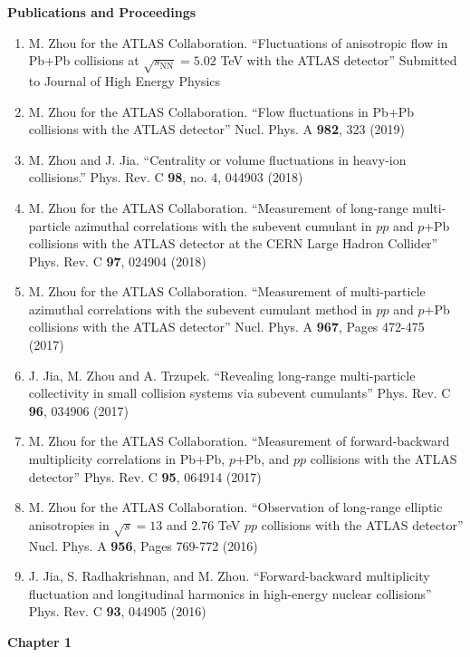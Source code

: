 \documentclass[12pt]{article}
\begin{document}
\newpage
\centerline{\bf{Publications and Proceedings}}
\vspace*{4\baselineskip}
\begin{enumerate}
\item M. Zhou for the ATLAS Collaboration. ``Fluctuations of anisotropic flow in Pb+Pb collisions at $\sqrt{s_\text{NN}}=5.02$ TeV with the ATLAS detector'' Submitted to Journal of High Energy Physics
\item M. Zhou for the ATLAS Collaboration. ``Flow fluctuations in Pb+Pb collisions with the ATLAS detector'' Nucl. Phys. A \textbf{982}, 323 (2019)
\item M. Zhou and J. Jia. ``Centrality or volume fluctuations in heavy-ion collisions.'' Phys. Rev. C \textbf{98}, no. 4, 044903 (2018)
\item M. Zhou for the ATLAS Collaboration. ``Measurement of long-range multi-particle azimuthal correlations with the subevent cumulant in $pp$ and $p$+Pb collisions with the ATLAS detector at the CERN Large Hadron Collider'' Phys. Rev. C \textbf{97}, 024904 (2018)
\item M. Zhou for the ATLAS Collaboration. ``Measurement of multi-particle azimuthal correlations with the subevent cumulant method in $pp$ and $p$+Pb collisions with the ATLAS detector'' Nucl. Phys. A \textbf{967}, Pages 472-475 (2017)
\item J. Jia, M. Zhou and A. Trzupek. ``Revealing long-range multi-particle collectivity in small collision systems via subevent cumulants'' Phys. Rev. C \textbf{96}, 034906 (2017)
\item M. Zhou for the ATLAS Collaboration. ``Measurement of forward-backward multiplicity correlations in Pb+Pb, $p$+Pb, and $pp$ collisions with the ATLAS detector'' Phys. Rev. C \textbf{95}, 064914 (2017)
\item M. Zhou for the ATLAS Collaboration. ``Observation of long-range elliptic anisotropies in $\sqrt{s}=13$ and 2.76 TeV $pp$ collisions with the ATLAS detector'' Nucl. Phys. A \textbf{956}, Pages 769-772 (2016)
\item J. Jia, S. Radhakrishnan, and M. Zhou. ``Forward-backward multiplicity fluctuation and longitudinal harmonics in high-energy nuclear collisions'' Phys. Rev. C \textbf{93}, 044905 (2016)
\end{enumerate}


\newpage
{\bf\huge{Chapter 1}\par}

\end{document}
